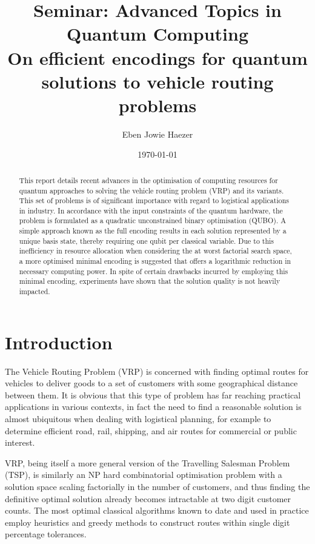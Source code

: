 \documentclass {article}
\title {
	Seminar: Advanced Topics in \\
	Quantum Computing \\
	On efficient encodings for quantum \\
	solutions to vehicle routing problems
}
\author {Eben Jowie Haezer}
\date {\today}
\begin{document}
\maketitle

\begin {abstract}
This report details recent advances in the optimisation of computing resources
for quantum approaches to solving the vehicle routing problem (VRP) and 
its variants. This set of problems is of significant importance with regard
to logistical applications in industry. In accordance with the input
constraints of the quantum hardware, the problem is formulated as a quadratic
unconstrained binary optimisation (QUBO). A simple approach known as the
full encoding results in each solution represented by a unique basis state,
thereby requiring one qubit per classical variable. Due to this inefficiency
in resource allocation when considering the at worst factorial search space,
a more optimised minimal encoding is suggested that offers a logarithmic
reduction in necessary computing power. In spite of certain drawbacks incurred
by employing this minimal encoding, experiments have shown that the solution
quality is not heavily impacted.
\end {abstract}

%

\section {Introduction}
The Vehicle Routing Problem (VRP) is concerned with finding optimal routes
for vehicles to deliver goods to a set of customers with some geographical
distance between them. It is obvious that this type of problem has far
reaching practical applications in various contexts, in fact the need to find
a reasonable solution is almost ubiquitous when dealing with logistical
planning, for example to determine efficient road, rail, shipping, and air
routes for commercial or public interest.

VRP, being itself a more general version of the Travelling Salesman Problem
(TSP), is similarly an NP hard combinatorial optimisation problem with a
solution space scaling factorially in the number of customers, and thus
finding the definitive optimal solution already becomes intractable at
two digit customer counts. The most optimal classical algorithms known to date
and used in practice employ heuristics and greedy methods to construct routes
within single digit percentage tolerances.
\end{document}

